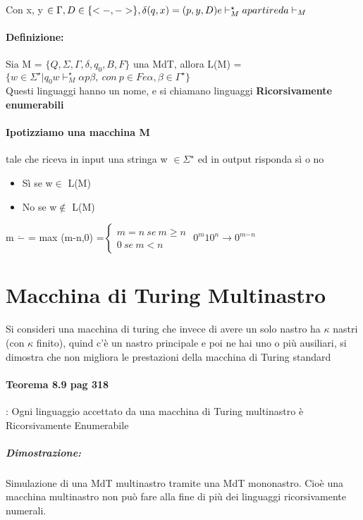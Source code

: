 \documentclass[12pt, a4paper, openany, oneside]{book}
\begin{document}
\begin{center}
\end{center}
Con x, y $\in \Gamma, D \in \{<-, ->\}, \delta(q, x) = (p, y, D) e \\
\vdash^{\star}_{M} a partire da \vdash_{M}$
\paragraph{Definizione: }Sia  M = $\{Q, \Sigma, \Gamma, \delta, q_{0}, B, F\}$ 
una MdT, allora L(M) = $\{w \in \Sigma^{\star} | q_{0}w \vdash^{\star}_{M}
 \alpha p \beta, ~con~p \in F e \alpha, \beta \in \Gamma^{\star}\}$
\\ Questi linguaggi hanno un nome, e si chiamano linguaggi \textbf{Ricorsivamente
enumerabili}
\paragraph{Ipotizziamo una macchina M} tale che
riceva in input una stringa w $\in \Sigma^{\star}$ ed in output risponda sì o no 
\begin{itemize}
	\item Sì se w$\in$ L(M)
	\item No se w$\notin$ L(M)
\end{itemize}
m $\dot-$ = max (m-n,0) =$\begin{cases}
	m = n ~ se ~ m \geq n\\
	0 ~ se ~ m < n
\end{cases}$
$0^{m} 1 0^{n} \to 0^{m \dot- n}$
\section{Macchina di Turing Multinastro}
Si consideri una macchina di turing che invece di avere un solo nastro ha $\kappa$ nastri
(con $\kappa$ finito), quind c'è un  nastro principale e poi ne hai uno o più
ausiliari, si dimostra che non migliora le prestazioni della macchina di Turing
standard
\paragraph{Teorema 8.9 pag 318}: Ogni linguaggio accettato da una macchina di 
Turing multinastro è Ricorsivamente Enumerabile
\subparagraph{Dimostrazione: }Simulazione di una MdT multinastro tramite una 
MdT mononastro. Cioè una macchina multinastro non può fare alla fine di più
dei linguaggi ricorsivamente numerali.
\end{document}
